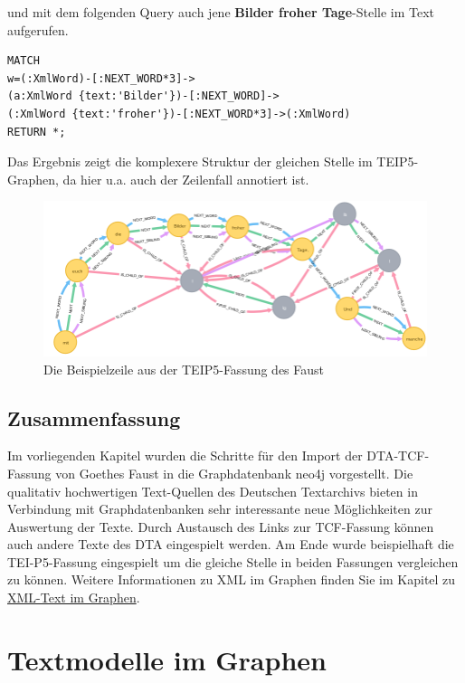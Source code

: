 \documentclass[ngerman,]{scrreprt}
\begin{document}
und mit dem folgenden Query auch jene \textbf{Bilder froher Tage}-Stelle im Text aufgerufen.

\begin{verbatim}
MATCH
w=(:XmlWord)-[:NEXT_WORD*3]->
(a:XmlWord {text:'Bilder'})-[:NEXT_WORD]->
(:XmlWord {text:'froher'})-[:NEXT_WORD*3]->(:XmlWord)
RETURN *;
\end{verbatim}

Das Ergebnis zeigt die komplexere Struktur der gleichen Stelle im TEIP5-Graphen, da hier u.a. auch der Zeilenfall annotiert ist.

\begin{figure}
\centering
\includegraphics{Bilder/TEI2Graph/BilderFroherTageP5.png}
\caption{Die Beispielzeile aus der TEIP5-Fassung des Faust}
\end{figure}

\section{Zusammenfassung}\label{zusammenfassung-3}

Im vorliegenden Kapitel wurden die Schritte für den Import der DTA-TCF-Fassung von Goethes Faust in die Graphdatenbank neo4j vorgestellt. Die qualitativ hochwertigen Text-Quellen des Deutschen Textarchivs bieten in Verbindung mit Graphdatenbanken sehr interessante neue Möglichkeiten zur Auswertung der Texte. Durch Austausch des Links zur TCF-Fassung können auch andere Texte des DTA eingespielt werden. Am Ende wurde beispielhaft die TEI-P5-Fassung eingespielt um die gleiche Stelle in beiden Fassungen vergleichen zu können. Weitere Informationen zu XML im Graphen finden Sie im Kapitel zu \href{https://kuczera.github.io/Graphentechnologien/60_XML-Text-im-Graphen.html}{XML-Text im Graphen}.

\chapter{Textmodelle im Graphen}\label{textmodelle-im-graphen}
\end{document}
